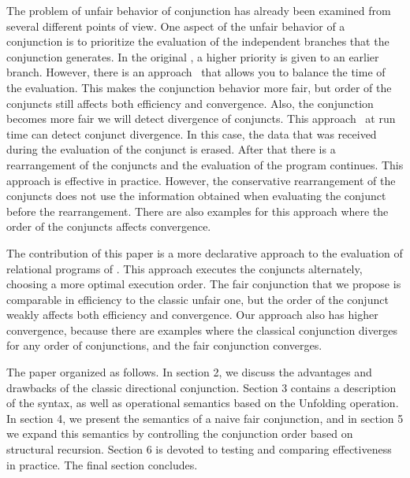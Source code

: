 The problem of unfair behavior of conjunction has already been examined from several different points of view. One aspect of the unfair behavior of a conjunction is to prioritize the evaluation of the independent branches that the conjunction generates. In the original \mk, a higher priority is given to an earlier branch. However, there is an approach~\cite{fair:towardsAM} that allows you to balance the time of the evaluation. This makes the conjunction behavior more fair, but order of the conjuncts still affects both efficiency and convergence. Also, the conjunction becomes more fair we will detect divergence of conjuncts. This approach~\cite{fair:DivTest} at run time can detect conjunct divergence. In this case, the data that was received during the evaluation of the conjunct is erased. After that there is a rearrangement of the conjuncts and the evaluation of the program continues. This approach is effective in practice. However, the conservative rearrangement of the conjuncts does not use the information obtained when evaluating the conjunct before the rearrangement. There are also examples for this approach where the order of the conjuncts affects convergence.

The contribution of this paper is a more declarative approach to the evaluation of relational programs of \mk. This approach executes the conjuncts alternately, choosing a more optimal execution order. The fair conjunction that we propose is comparable in efficiency to the classic unfair one, but the order of the conjunct weakly affects both efficiency and convergence. Our approach also has higher convergence, because there are examples where the classical conjunction diverges for any order of conjunctions, and the fair conjunction converges.

The paper organized as follows. In section 2, we discuss the advantages and drawbacks of the classic directional conjunction. Section 3 contains a description of the \mk syntax, as well as operational semantics based on the Unfolding operation. In section 4, we present the semantics of a naive fair conjunction, and in section 5 we expand this semantics by controlling the conjunction order based on structural recursion. Section 6 is devoted to testing and comparing effectiveness in practice. The final section concludes.

